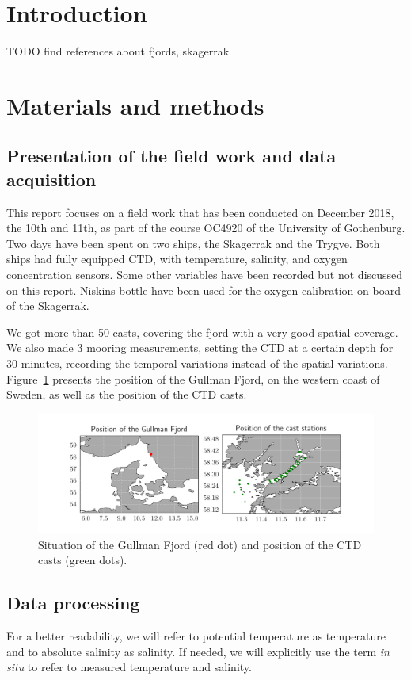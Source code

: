 \documentclass[12pt,a4paper]{article}
\begin{document}
\newpage

\section{\label{sec_intro}Introduction}

TODO find references about fjords, skagerrak

\section{Materials and methods}
\subsection{Presentation of the field work and data acquisition}

This report focuses on a field work that has been conducted on December 2018, the
10th and 11th, as part of the course OC4920 of the University of Gothenburg.
Two days have been spent on two ships, the Skagerrak and the Trygve.
Both ships had fully equipped CTD, with temperature, salinity, and oxygen concentration
sensors. Some other variables have been recorded but not discussed on this
report. Niskins bottle have been used for the oxygen calibration on board of
the Skagerrak.

We got more than 50 casts, covering the fjord with a very good spatial coverage.
We also made 3 mooring measurements, setting the CTD at a certain depth
for 30 minutes, recording the temporal variations instead of the
spatial variations.
Figure~\ref{fig:stations} presents the position of the Gullman Fjord, on the western
coast of Sweden, as well as the position of the CTD casts.

\begin{figure}
  \centering
  \includegraphics{stations}
  \caption{\label{fig:stations}Situation of the Gullman Fjord (red dot) and position
    of the CTD casts (green dots).}
\end{figure}

\subsection{Data processing}
For a better readability, we will refer to potential temperature as temperature
and to absolute salinity as salinity.
If needed, we will explicitly use the term {\it in situ} to refer to
measured temperature and salinity.
\end{document}
